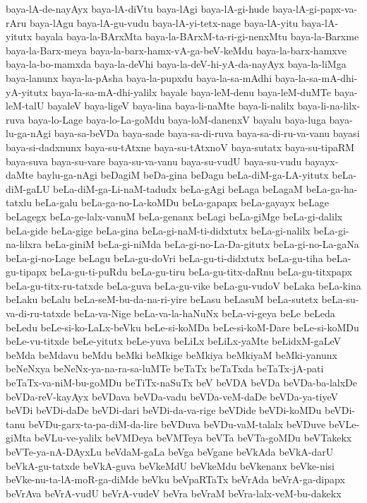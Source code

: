 {baya-lA-de-nayAyx
baya-lA-diVtu
baya-lAgi
baya-lA-gi-hude
baya-lA-gi-papx-va-rAru
baya-lAgu
baya-lA-gu-vudu
baya-lA-yi-tetx-nage
baya-lA-yitu
baya-lA-yitutx
bayala
baya-la-BArxMta
baya-la-BArxM-ta-ri-gi-nenxMtu
baya-la-Barxme
baya-la-Barx-meya
baya-la-barx-hamx-vA-ga-beV-keMdu
baya-la-barx-hamxve
baya-la-bo-mamxda
baya-la-deVhi
baya-la-deV-hi-yA-da-nayAyx
baya-la-liMga
baya-lanunx
baya-la-pAsha
baya-la-pupxdu
baya-la-sa-mAdhi
baya-la-sa-mA-dhi-yA-yitutx
baya-la-sa-mA-dhi-yalilx
bayale
baya-leM-denu
baya-leM-duMTe
baya-leM-talU
bayaleV
baya-ligeV
baya-lina
baya-li-naMte
baya-li-nalilx
baya-li-na-lilx-ruva
baya-lo-Lage
baya-lo-La-goMdu
baya-loM-danenxV
bayalu
baya-luga
baya-lu-ga-nAgi
baya-sa-beVDa
baya-sade
baya-sa-di-ruva
baya-sa-di-ru-va-vanu
bayasi
baya-si-dadxnunx
baya-su-tAtxne
baya-su-tAtxnoV
baya-sutatx
baya-su-tipaRM
baya-suva
baya-su-vare
baya-su-va-vanu
baya-su-vudU
baya-su-vudu
bayayx-daMte
baylu-ga-nAgi
beDagiM
beDa-gina
beDagu
beLa-diM-ga-LA-yitutx
beLa-diM-gaLU
beLa-diM-ga-Li-naM-tadudx
beLa-gAgi
beLaga
beLagaM
beLa-ga-ha-tatxlu
beLa-galu
beLa-ga-no-La-koMDu
beLa-gapapx
beLa-gayayx
beLage
beLagegx
beLa-ge-lalx-vanuM
beLa-genanx
beLagi
beLa-giMge
beLa-gi-dalilx
beLa-gide
beLa-gige
beLa-gina
beLa-gi-naM-ti-didxtutx
beLa-gi-nalilx
beLa-gi-na-lilxra
beLa-giniM
beLa-gi-niMda
beLa-gi-no-La-Da-gitutx
beLa-gi-no-La-gaNa
beLa-gi-no-Lage
beLagu
beLa-gu-doVri
beLa-gu-ti-didxtutx
beLa-gu-tiha
beLa-gu-tipapx
beLa-gu-ti-puRdu
beLa-gu-tiru
beLa-gu-titx-daRnu
beLa-gu-titxpapx
beLa-gu-titx-ru-tatxde
beLa-guva
beLa-gu-vike
beLa-gu-vudoV
beLaka
beLa-kina
beLaku
beLalu
beLa-seM-bu-da-na-ri-yire
beLasu
beLasuM
beLa-sutetx
beLa-su-va-di-ru-tatxde
beLa-va-Nige
beLa-va-la-haNuNx
beLa-vi-geya
beLe
beLeda
beLedu
beLe-si-ko-LaLx-beVku
beLe-si-koMDa
beLe-si-koM-Dare
beLe-si-koMDu
beLe-vu-titxde
beLe-yitutx
beLe-yuva
beLiLx
beLiLx-yaMte
beLidxM-gaLeV
beMda
beMdavu
beMdu
beMki
beMkige
beMkiya
beMkiyaM
beMki-yanunx
beNeNxya
beNeNx-ya-na-ra-sa-luMTe
beTaTx
beTaTxda
beTaTx-jA-pati
beTaTx-va-niM-bu-goMDu
beTiTx-naSuTx
beV
beVDA
beVDa
beVDa-ba-lalxDe
beVDa-reV-kayAyx
beVDava
beVDa-vadu
beVDa-veM-daDe
beVDa-ya-tiyeV
beVDi
beVDi-daDe
beVDi-dari
beVDi-da-va-rige
beVDide
beVDi-koMDu
beVDi-tanu
beVDu-garx-ta-pa-diM-da-lire
beVDuva
beVDu-vaM-talalx
beVDuve
beVLe-giMta
beVLu-ve-yalilx
beVMDeya
beVMTeya
beVTa
beVTa-goMDu
beVTakekx
beVTe-ya-nA-DAyxLu
beVdaM-gaLa
beVga
beVgane
beVkAda
beVkA-darU
beVkA-gu-tatxde
beVkA-guva
beVkeMdU
beVkeMdu
beVkenanx
beVke-nisi
beVke-nu-ta-lA-moR-ga-diMde
beVku
beVpaRTaTx
beVrAda
beVrA-ga-dipapx
beVrAva
beVrA-vudU
beVrA-vudeV
beVra
beVraM
beVra-lalx-veM-bu-dakekx
}
